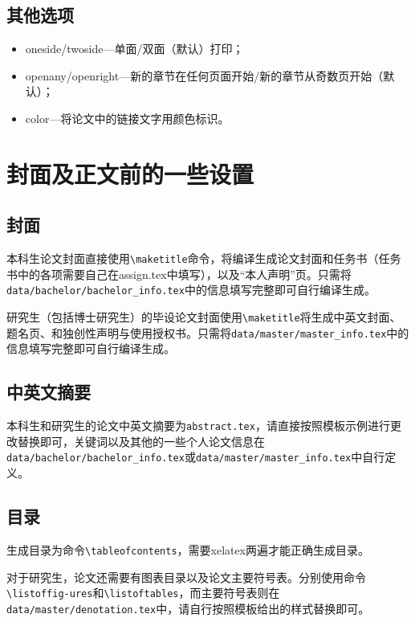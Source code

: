 \subsection{其他选项}
    \begin{itemize}
        \item oneside\slash twoside---单面\slash 双面（默认）打印；
        \item openany\slash openright---新的章节在任何页面开始\slash 新的章节从奇数页开始（默认）；
        \item color---将论文中的链接文字用颜色标识。
    \end{itemize}

\section{封面及正文前的一些设置}
\subsection{封面}
本科生论文封面直接使用\texttt{\textbackslash maketitle}命令，将编译生成论文封面和任务书（任务书中的各项需要自己在assign.tex中填写），以及“本人声明”页。只需将\texttt{data/bachelor/bachelor\_info.tex}中的信息填写完整即可自行编译生成。

研究生（包括博士研究生）的毕设论文封面使用\texttt{\textbackslash maketitle}将生成中英文封面、题名页、和独创性声明与使用授权书。只需将\texttt{data/master/master\_info.tex}中的信息填写完整即可自行编译生成。

\subsection{中英文摘要}
本科生和研究生的论文中英文摘要为\texttt{abstract.tex}，请直接按照模板示例进行更改替换即可，关键词以及其他的一些个人论文信息在\texttt{data/bachelor/bachelor\_info.tex}或\texttt{data/master/master\_info.tex}中自行定义。

\subsection{目录}
生成目录为命令\texttt{\textbackslash tableofcontents}，需要xelatex两遍才能正确生成目录。

对于研究生，论文还需要有图表目录以及论文主要符号表。分别使用命令\texttt{\textbackslash listoffig\hyp{}ures}和\texttt{\textbackslash listoftables}，而主要符号表则在\texttt{data/master/denotation.tex}中，请自行按照模板给出的样式替换即可。

